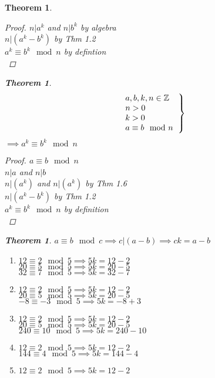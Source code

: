 \documentclass{article}
\newtheorem{theorem}[section]{Theorem}
\begin{document}
\begin{theorem}
\begin{proof}
	$n|a^k$ and $n|b^k$ by algebra\\
	$n|(a^k-b^k)$ by Thm 1.2\\
	$a^k \equiv b^k \mod{n}$ by defintion\\
\end{proof}\begin{theorem}%
		\[\left .
		\begin{tabular}{l}
			$a,b,k,n \in \mathbb{Z}$\\
			$n > 0$\\
			$k > 0$\\
			$a \equiv b \mod{n}$\\
		\end{tabular}
	\right \}\]
	$\implies a^k \equiv b^k \mod{n}$\\
	\end{theorem}\begin{proof} $a \equiv b \mod{n}$\\
	$n|a$ and $n|b$\\
	$n|(a^k)$ and $n|(a^k)$ by Thm 1.6\\
	$n|(a^k-b^k)$ by Thm 1.2\\
	$a^k \equiv b^k \mod{n}$ by definition\\
\end{proof}\begin{theorem}%
	$ a \equiv b \mod{c} \implies c|(a-b) \implies ck = a-b$
	\begin{enumerate}
		\item
			$12 \equiv 2 \mod{5} \implies 5k = 12-2$\\
			$20 \equiv 5 \mod{5} \implies 5k = 20-5$\\
			$32 \equiv 7 \mod{5} \implies 5k = 32-7$
        \item
			$12 \equiv 2 \mod{5} \implies 5k = 12-2$\\
			$20 \equiv 5 \mod{5} \implies 5k = 20-5$\\
			$-8 \equiv -3 \mod{5} \implies 5k = -8+3$
		\item
			$12 \equiv 2 \mod{5} \implies 5k = 12-2$\\
			$20 \equiv 5 \mod{5} \implies 5k = 20-5$\\
			$240 \equiv 10 \mod{5} \implies 5k = 240-10$
		\item
			$12 \equiv 2 \mod{5} \implies 5k = 12-2$\\
			$144 \equiv 4 \mod{5} \implies 5k = 144-4$
		\item
			$12 \equiv 2 \mod{5} \implies 5k = 12-2$\\

\end{enumerate}
\end{theorem}
\end{theorem}
\end{document}
